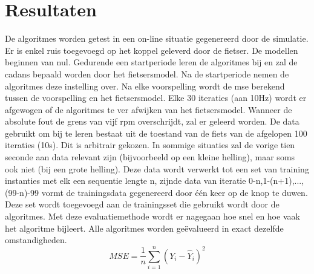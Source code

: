 \chapter{Resultaten}
De algoritmes worden getest in een on-line situatie gegenereerd door de simulatie. Er is enkel ruis toegevoegd op het koppel geleverd door de fietser. De modellen beginnen van nul. Gedurende een startperiode leren de algoritmes bij en zal de cadans bepaald worden door het fietsersmodel. Na de startperiode nemen de algoritmes deze instelling over. Na elke voorspelling wordt de \gls{mse} berekend tussen de voorspelling en het fietsersmodel. Elke 30 iteraties (aan 10Hz) wordt er afgewogen of de algoritmes te ver afwijken van het fietsersmodel. Wanneer de absolute fout de grens van vijf rpm overschrijdt, zal er geleerd worden. De data gebruikt om bij te leren bestaat uit de toestand van de fiets van de afgelopen 100 iteraties (10s). Dit is arbitrair gekozen. In sommige situaties zal de vorige tien seconde aan data relevant zijn (bijvoorbeeld op een kleine helling), maar soms ook niet (bij een grote helling). Deze data wordt verwerkt tot een set van training instanties met elk een sequentie lengte n, zijnde data van iteratie 0-n,1-(n+1),..., (99-n)-99 vormt de trainingsdata gegenereerd door één keer op de knop te duwen. Deze set wordt toegevoegd aan de trainingsset die gebruikt wordt door de algoritmes. Met deze evaluatiemethode wordt er nagegaan hoe snel en hoe vaak het algoritme bijleert. Alle algoritmes worden geëvalueerd in exact dezelfde omstandigheden.
\[MSE = \frac{1}{n} \sum_{i=1}^{n} (Y_i-\hat{Y}_i)^2\]

